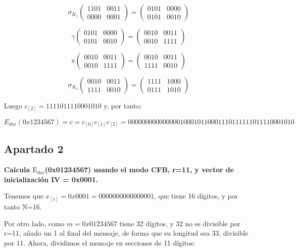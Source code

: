 \documentclass[a4paper]{article}
\begin{document}
$$\sigma_{K_1} \begin{pmatrix} 1101 & 0011 \\ 0000 & 0001 \end{pmatrix} = \begin{pmatrix} 0101 & 0000 \\ 0101 & 0010 \end{pmatrix}$$

$$\gamma \begin{pmatrix} 0101 & 0000 \\ 0101 & 0010 \end{pmatrix} = \begin{pmatrix} 0010 & 0011 \\ 0010 & 1111 \end{pmatrix}$$

$$\pi \begin{pmatrix} 0010 & 0011 \\ 0010 & 1111 \end{pmatrix} = \begin{pmatrix} 0010 & 0011 \\ 1111 & 0010 \end{pmatrix}$$

$$\sigma_{K_2} \begin{pmatrix} 0010 & 0011 \\ 1111 & 0010 \end{pmatrix} = \begin{pmatrix} 1111 & 1000 \\ 0111 & 1010 \end{pmatrix}$$

Luego $c_{[2]} = 1111 0111 1000 1010$ y, por tanto:

$$E_{dni}(0x1234567) = c = c_{[0]}c_{[1]}c_{[2]} = 0000 0000 0000 0001 0001 0110 0011 1011 1111 0111 1000 1010$$




\subsection{Apartado 2}
\textbf{Calcula $\text{E}_{dni}$(0x01234567) usando el modo CFB, r=11, y
vector de inicialización IV = 0x0001.}

Tenemos que $x_{[1]} = 0x0001=0000 0000 0000 0001$, que tiene 16 dígitos, y por tanto N=16.

Por otro lado, como $m=0x01234567$ tiene 32 dígitos, y 32 no es divisible por r=11, añado un 1 al final del mensaje, de forma que su longitud sea 33, divisible por 11. Ahora, dividimos el mensaje en secciones de 11 dígitos:
\end{document}
